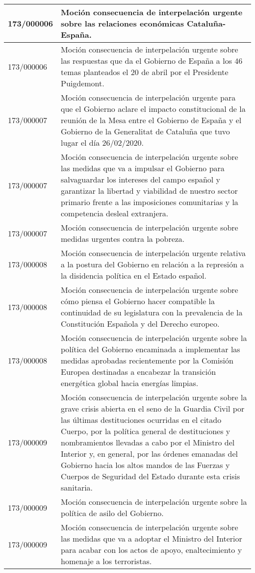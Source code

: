 {\begin{table}[H]
\begin{center}
\begin{tabularx}{\linewidth}{| l | X |}
\hline
173/000006 & Moción consecuencia de interpelación urgente sobre las relaciones económicas Cataluña-España. \\
\hline
173/000006 & Moción consecuencia de interpelación urgente sobre las respuestas que da el Gobierno de España a los 46 temas planteados el 20 de abril por el Presidente Puigdemont. \\
\hline
173/000007 & Moción consecuencia de interpelación urgente para que el Gobierno aclare el impacto constitucional de la reunión de la Mesa entre el Gobierno de España y el Gobierno de la Generalitat de Cataluña que tuvo lugar el día 26/02/2020. \\
\hline
173/000007 & Moción consecuencia de interpelación urgente sobre las medidas que va a impulsar el Gobierno para salvaguardar los intereses del campo español y garantizar la libertad y viabilidad de nuestro sector primario frente a las imposiciones comunitarias y la competencia desleal extranjera. \\
\hline
173/000007 & Moción consecuencia de interpelación urgente sobre medidas urgentes contra la pobreza. \\
\hline
173/000008 & Moción consecuencia de interpelación urgente relativa a la postura del Gobierno en relación a la represión a la disidencia política en el Estado español. \\
\hline
173/000008 & Moción consecuencia de interpelación urgente sobre cómo piensa el Gobierno hacer compatible la continuidad de su legislatura con la prevalencia de la Constitución Española y del Derecho europeo. \\
\hline
173/000008 & Moción consecuencia de interpelación urgente sobre la política del Gobierno encaminada a implementar las medidas aprobadas recientemente por la Comisión Europea destinadas a encabezar la transición energética global hacia energías limpias. \\
\hline
173/000009 & Moción consecuencia de interpelación urgente sobre la grave crisis abierta en el seno de la Guardia Civil por las últimas destituciones ocurridas en el citado Cuerpo, por la política general de destituciones y nombramientos llevadas a cabo por el Ministro del Interior y, en general, por las órdenes emanadas del Gobierno hacia los altos mandos de las Fuerzas y Cuerpos de Seguridad del Estado durante esta crisis sanitaria. \\
\hline
173/000009 & Moción consecuencia de interpelación urgente sobre la política de asilo del Gobierno. \\
\hline
173/000009 & Moción consecuencia de interpelación urgente sobre las medidas que va a adoptar el Ministro del Interior para acabar con los actos de apoyo, enaltecimiento y homenaje a los terroristas. \\

\end{tabularx}
\end{center}
\end{table}}
